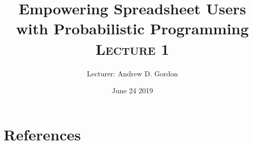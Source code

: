 \documentclass{article}
\title{Empowering Spreadsheet Users \\ with Probabilistic Programming \\ \textsc{Lecture 1}}
\author{Lecturer: Andrew D. Gordon}
\date{June 24 2019}
\begin{document}
\maketitle

\tableofcontents





\section{References}

\appendix

{}


\clearpage




\clearpage

\glsaddall
\printglossaries
\end{document}
